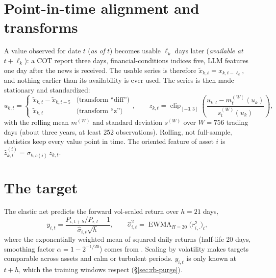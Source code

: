 \section{Point-in-time alignment and transforms}
A value observed for date $t$ (\emph{as of} $t$) becomes usable $\ell_k$ days later (\emph{available at}
$t+\ell_k$): a COT report three days, financial-conditions indices five, LLM features one day after the news is
received. The usable series is therefore $\tilde x_{k,t}=x_{k,t-\ell_k}$, and nothing earlier than its
availability is ever used. The series is then made stationary and standardized:
\[
  u_{k,t}=\begin{cases}\tilde x_{k,t}-\tilde x_{k,t-5}&\text{(transform ``diff'')}\\ \tilde x_{k,t}&\text{(transform ``z'')}\end{cases},
  \qquad
  z_{k,t}=\operatorname{clip}_{[-3,3]}\!\left(\frac{u_{k,t}-m_t^{(W)}(u_k)}{s_t^{(W)}(u_k)}\right),
\]
with the rolling mean $m^{(W)}$ and standard deviation $s^{(W)}$ over $W=756$ trading days (about three years,
at least 252 observations). Rolling, not full-sample, statistics keep every value point in time. The oriented
feature of asset $i$ is $\hat z^{(i)}_{k,t}=\sigma_{k,c(i)}\,z_{k,t}$.

\section{The target}
The elastic net predicts the forward vol-scaled return over $h=21$ days,
\[
  y_{i,t}=\frac{P_{i,t+h}/P_{i,t}-1}{\hat\sigma_{i,t}\sqrt h},\qquad
  \hat\sigma_{i,t}^2=\operatorname{EWMA}_{H=20}\big(r_{i,\cdot}^2\big)_t ,
\]
where the exponentially weighted mean of squared daily returns (half-life 20 days, smoothing factor
$\alpha=1-2^{-1/20}$) comes from . Scaling by volatility makes targets
comparable across assets and calm or turbulent periods. $y_{i,t}$ is only known at $t+h$, which the training
windows respect (\S\ref{sec:rb-purge}).
\begin{codepointers}
\end{codepointers}

